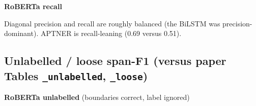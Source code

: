 \textbf{RoBERTa recall}


\begin{table}[h!]
\centering
{}%
\caption{RoBERTa recall on each development dataset after training on each dataset.}
\label{tab:cross_eval_matrix_recall_roberta}
\end{table}

Diagonal precision and recall are roughly balanced (the BiLSTM was precision-dominant). APTNER is recall-leaning (0.69 versus 0.51).

\subsection*{Unlabelled / loose span-F1 (versus paper Tables \texttt{\_unlabelled}, \texttt{\_loose})}

\textbf{RoBERTa unlabelled} (boundaries correct, label ignored)


\begin{table}[h!]
\centering
{}%
\caption{RoBERTa unlabelled span-F1 on each development dataset after training on each dataset.}
\label{tab:unlabelled_span_f1_cross_dataset_roberta}
\end{table}


